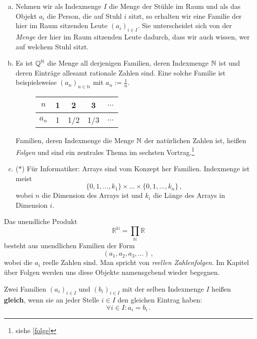 \begin{bsp}
	\begin{enumerate}[a)]
	\item Nehmen wir als Indexmenge $I$ die Menge der Stühle im Raum und als das Objekt $a_i$ die Person, die auf Stuhl $i$ sitzt, so erhalten wir eine Familie der hier im Raum sitzenden Leute $(a_i)_{i\in I}$. Sie unterscheidet sich von der \textit{Menge} der hier im Raum sitzenden Leute dadurch, dass wir auch wissen, wer auf welchem Stuhl sitzt.
	
	\item Es ist ${\mathbb Q}^{\mathbb N}$ die Menge all derjenigen Familien, deren Indexmenge ${\mathbb N}$ ist und deren Einträge allesamt rationale Zahlen sind. Eine solche Familie ist beispielsweise $(a_n)_{n\in\mathbb{N}}$ mit $a_n:=\frac{1}{n}$.
		\begin{figure}[h]
			\centering
			\begin{tabular}{c|cccc}
				$n$ & 1 & 2 & 3 & $\dots$ \\ \midrule
				$a_n$ & 1 & 1/2 & 1/3 & $\dots$
			\end{tabular}
		\end{figure}
Familien, deren Indexmenge die Menge ${\mathbb N}$ der natürlichen Zahlen ist, heißen \emph{Folgen} und sind ein zentrales Thema im sechsten Vortrag.\footnote{siehe \cref{folge}}
	\item ($*$) Für Informatiker: Arrays sind vom Konzept her Familien. Indexmenge ist meist
		\[ \{0,1,\ldots,k_1\}\times\dots\times\{0,1,\dots,k_n\} \,,\]
		wobei $n$ die Dimension des Arrays ist und $k_i$ die Länge des Arrays in Dimension $i$.
	\end{enumerate}
\end{bsp}


\begin{bsp}
	Das unendliche Produkt
		\[ \mathbb{R}^\mathbb{N}=\prod_\mathbb{N}\mathbb{R} \]
	besteht aus unendlichen Familien der Form
		\[ (a_1,a_2,a_3,\dots)\,, \]
	wobei die $a_i$ reelle Zahlen sind. Man spricht von \emph{reellen Zahlenfolgen}. Im Kapitel über Folgen werden uns diese Objekte namensgebend wieder begegnen.
\end{bsp}

\begin{de} \label{gleichheit:familien}
	Zwei Familien $(a_i)_{i\in I}$ und $(b_i)_{i\in I}$ mit der selben Indexmenge $I$ heißen \textbf{gleich}, wenn sie an jeder Stelle $i\in I$ den gleichen Eintrag haben:
		\[ \forall i\in I: a_i=b_i \,. \]
\end{de}

